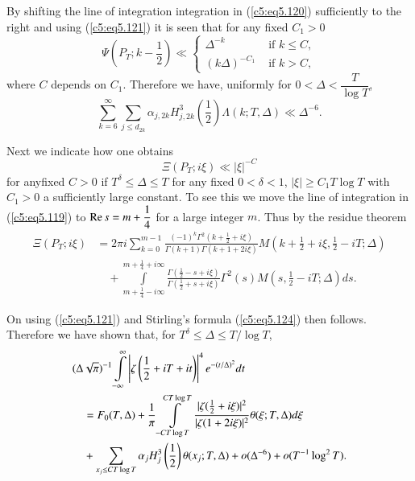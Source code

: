 By shifting the line of integration integration in (\ref{c5:eq5.120})
sufficiently to the right and using (\ref{c5:eq5.121}) it is seen that
for any fixed $C_1 > 0$ 
\begin{equation}
\Psi \left(P_T;k - \frac{1}{2} \right) \ll 
\begin{cases}
\Delta^{-k} &  \text{ if } k \leq C,\\
(k\Delta)^{-C_1} & \text{ if } k >  C,
\end{cases}\label{c5:eq5.122}
\end{equation}
where $C$ depends on $C_1$. Therefore we have, uniformly for $0<\Delta
< \dfrac{T}{\log T}$, 
\begin{equation}
\sum\limits^\infty_{k=6} \sum\limits_{j \leq d_{2k}} \alpha_{j,2k}
H^3_{j,2k} \left(\frac{1}{2} \right) \Lambda (k;T,\Delta) \ll
\Delta^{-6}.\label{c5:eq5.123} 
\end{equation}

Next we indicate how one obtains
\begin{equation}
\Xi (P_T ; i\xi) \ll |\xi|^{-C}\label{c5:eq5.124}
\end{equation}
for any\pageoriginale fixed $C > 0$ if  $T^\delta \leq \Delta \leq T$
for any fixed $0 < \delta <1$, $|\xi| \geq C_1 T \log T$ with $C_1 >
0$ a sufficiently large constant. To see this we move the line of
integration in (\ref{c5:eq5.119}) to $\operatorname{Re} s = m + \dfrac{1}{4}$ for a
large integer $m$. Thus by the residue theorem 
\begin{align*}
\Xi (P_T ; i\xi) &= 2 \pi i \sum\limits^{m-1}_{k=0}
\frac{(-1)^k\Gamma^2 (k + \frac{1}{2} + i \xi)}{\Gamma (k+1) \Gamma
  (k+1 + 2 i \xi)} M \left(k + \frac{1}{2} + i \xi, \frac{1}{2} - i
T;\Delta \right)\\ 
&\quad + \int\limits^{m+ \frac{1}{4} + i \infty}_{m+ \frac{1}{4} - i
  \infty} \frac{\Gamma (\frac{1}{2} - s+ i \xi)}{\Gamma (\frac{1}{2} +
  s + i \xi)} \Gamma^2 (s) M \left(s, \frac{1}{2} - i T;\Delta \right)
ds .  
\end{align*}

On using (\ref{c5:eq5.121}) and Stirling's formula (\ref{c5:eq5.124})
then follows. Therefore we have shown that, for $T^\delta \leq \Delta
\leq T /\log T$, 
\begin{align}
& (\Delta \sqrt{\pi})^{-1} \int\limits^\infty_{-\infty}
  \left|\zeta\left(\frac{1}{2} + iT + it \right)\right|^4
  e^{-(t/\Delta)^2} dt \label{c5:eq5.125}\\ 
&\quad = F_0 (T,\Delta) + \frac{1}{\pi} \int\limits^{C T \log T}_{-C T \log
    T}  \frac{|\zeta(\frac{1}{2} + i \xi)|^2}{|\zeta(1+2i\xi)|^2}
  \theta (\xi ; T, \Delta) d \xi\notag\\ 
&\quad +  \sum\limits_{x_j \leq C T \log T} \alpha_j H^3_j
  \left(\frac{1}{2} \right) \theta (x_j;T,\Delta) + o(\Delta^{-6})  +
  o(T^{-1} \log^2 T). \notag 
\end{align}

